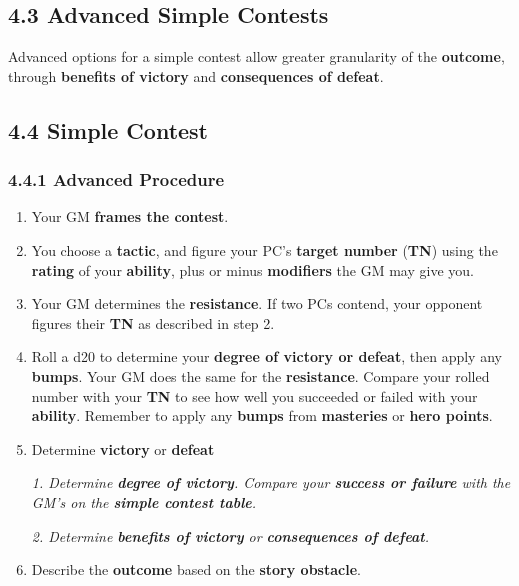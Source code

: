 \documentclass[
]{article}
\begin{document}
\hypertarget{advanced-simple-contests}{%
\subsection{4.3 Advanced Simple
Contests}\label{advanced-simple-contests}}

Advanced options for a simple contest allow greater granularity of the
\textbf{outcome}, through \textbf{benefits of victory} and
\textbf{consequences of defeat}.

\hypertarget{simple-contest-2}{%
\subsection{4.4 Simple Contest}\label{simple-contest-2}}

\hypertarget{advanced-procedure}{%
\subsubsection{4.4.1 Advanced Procedure}\label{advanced-procedure}}

\begin{enumerate}
\def\labelenumi{\arabic{enumi}.}
\item
  Your GM \textbf{frames the contest}.
\item
  You choose a \textbf{tactic}, and figure your PC's \textbf{target
  number} (\textbf{TN}) using the \textbf{rating} of your
  \textbf{ability}, plus or minus \textbf{modifiers} the GM may give
  you.
\item
  Your GM determines the \textbf{resistance}. If two PCs contend, your
  opponent figures their \textbf{TN} as described in step 2.
\item
  Roll a d20 to determine your \textbf{degree of victory or defeat},
  then apply any \textbf{bumps}. Your GM does the same for the
  \textbf{resistance}. Compare your rolled number with your \textbf{TN}
  to see how well you succeeded or failed with your \textbf{ability}.
  Remember to apply any \textbf{bumps} from \textbf{masteries} or
  \textbf{hero points}.
\item
  Determine \textbf{victory} or \textbf{defeat}

  \emph{1. Determine \textbf{degree of victory}. Compare your
  \textbf{success or failure} with the GM's on the \textbf{simple
  contest table}.}

  \emph{2. Determine \textbf{benefits of victory} or
  \textbf{consequences of defeat}.}
\item
  Describe the \textbf{outcome} based on the \textbf{story obstacle}.
\end{enumerate}
\end{document}
